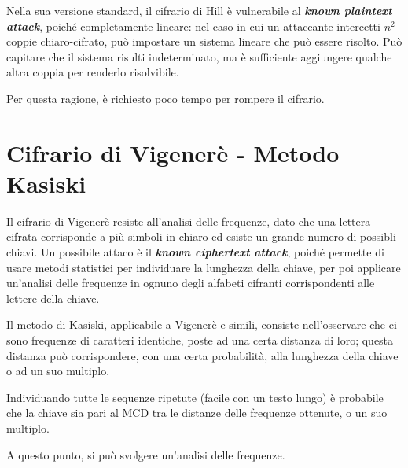 Nella sua versione standard, il cifrario di Hill è vulnerabile al \textit{\textbf{known plaintext attack}}, poiché completamente lineare: nel 
caso in cui un attaccante intercetti $n^2$ coppie chiaro-cifrato, può impostare un sistema lineare che può essere risolto. Può capitare che il 
sistema risulti indeterminato, ma è sufficiente aggiungere qualche altra coppia per renderlo risolvibile.

\noindent Per questa ragione, è richiesto poco tempo per rompere il cifrario.

\section{Cifrario di Vigenerè - Metodo Kasiski}

Il cifrario di Vigenerè resiste all'analisi delle frequenze, dato che una lettera cifrata corrisponde a più simboli in chiaro ed esiste un grande 
numero di possibli chiavi.
Un possibile attaco è il \textit{\textbf{known ciphertext attack}}, poiché permette di usare metodi statistici per individuare la lunghezza della 
chiave, per poi applicare un'analisi delle frequenze in ognuno degli alfabeti cifranti corrispondenti alle lettere della chiave.

\noindent Il metodo di Kasiski, applicabile a Vigenerè e simili, consiste nell'osservare che ci sono frequenze di caratteri identiche, poste 
ad una certa distanza di loro; questa distanza può corrispondere, con una certa probabilità, alla lunghezza della chiave o ad un suo multiplo.

\noindent Individuando tutte le sequenze ripetute (facile con un testo lungo) è probabile che la chiave sia pari al MCD tra le distanze delle 
frequenze ottenute, o un suo multiplo.

\noindent A questo punto, si può svolgere un'analisi delle frequenze.

